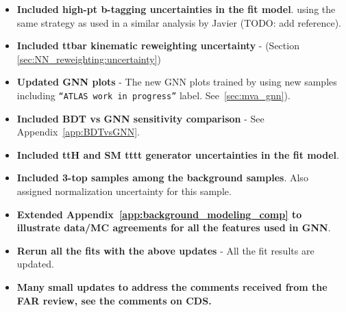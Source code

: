 \begin{itemize}

\item \textbf{Included high-pt b-tagging uncertainties in the fit model}. using the same strategy as used in a similar analysis by Javier (TODO: add reference).

\item \textbf{Included ttbar kinematic reweighting uncertainty} -  (Section \ref{sec:NN_reweighting:uncertainty})

\item \textbf{Updated GNN plots} - The new GNN plots trained by using new samples including \texttt{``ATLAS work in progress''} label. See~\ref{sec:mva_gnn}).

\item \textbf{Included BDT vs GNN sensitivity comparison} - See Appendix~\ref{app:BDTvsGNN}.

\item \textbf{Included ttH and SM tttt generator uncertainties in the fit model}.

\item \textbf{Included 3-top samples among the background samples}. Also assigned normalization uncertainty for this sample.

\item \textbf{Extended Appendix~\ref{app:background_modeling_comp}  to illustrate data/MC agreements for all the features used in GNN}.

\item \textbf{Rerun all the fits with the above updates} - All the fit results are updated.

\item \textbf{Many small updates to address the comments received from the FAR review, see the comments on CDS.}

\end{itemize}
